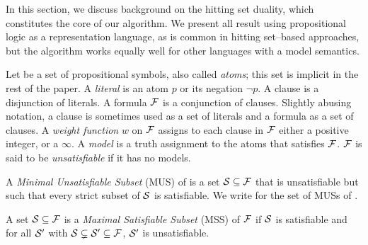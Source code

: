 
In this section, we discuss background on the hitting set duality, which constitutes the core of our algorithm. 
We present all result using propositional logic  as a representation language, as is common in hitting set--based approaches, but the algorithm works equally well for other languages with a model semantics. 
 
%  
% 
% 

\newcommand\F{\m{F}}
Let \voc be a set of propositional symbols, also called \emph{atoms}; this set is implicit in the rest of the paper. A \emph{literal} is an atom $p$ or its negation $\lnot p$. A clause is a disjunction of literals. A formula $\mathcal{F}$ is a conjunction of clauses. 
Slightly abusing notation, a clause is sometimes used as a set of literals and a formula as a set of clauses.
A \emph{weight function} $w$ on $\mathcal{F}$ assigns to each clause in $\mathcal{F}$ either a positive integer, or a $\infty$. 
A \emph{model} is a truth assignment
 to the atoms that satisfies $\mathcal{F}$.
$\mathcal{F}$ is said to be \emph{unsatisfiable} if it has no models. 

\begin{definition}
  A \emph{Minimal Unsatisfiable Subset} (MUS) of \F is a set $\m{S} \subseteq \F$  that is unsatisfiable but such that every strict subset of $\mathcal{S} $ is satisfiable. 
%   
  We write \muses{\F} for the set of MUSs of \F. 
\end{definition}



\begin{definition}
    A set $\mathcal{S} \subseteq \mathcal{F}$ is a \emph{Maximal Satisfiable Subset} (MSS) of $ \mathcal{F}$ if $\mathcal{S}$ is satisfiable and for all $\mathcal{S}'$ with $\mathcal{S}  \subsetneq  \mathcal{S}'\subseteq\mathcal{F} $, $\mathcal{S}'$ is unsatisfiable.
\end{definition}

